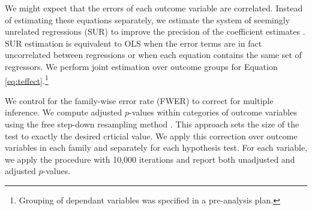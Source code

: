 \documentclass[11pt]{article}
\begin{document}



		We might expect that the errors of each outcome variable are correlated. Instead of estimating these equations separately, we estimate the system of seemingly unrelated regressions (SUR) to improve the precision of the coefficient estimates \parencite{zellner_efficient_1962}. SUR estimation is equivalent to OLS when the error terms are in fact uncorrelated between regressions or when each equation contains the same set of regressors. We perform joint estimation over outcome groups for Equation \ref{eq:teffect}.\footnote{Grouping of dependant variables was specified in a pre-analysis plan.}

		We control for the family-wise error rate (FWER) to correct for multiple inference. We compute adjusted $p$-values within categories of outcome variables using the free step-down resampling method \parencite{westfall_resampling-based_1993,anderson_multiple_2008}. This approach sets the size of the test to exactly the desired crticial value. We apply this correction over outcome variables in each family and separately for each hypothesis test. For each variable, we apply the procedure with 10,000 iterations and report both unadjusted and adjusted $p$-values.
\end{document}
